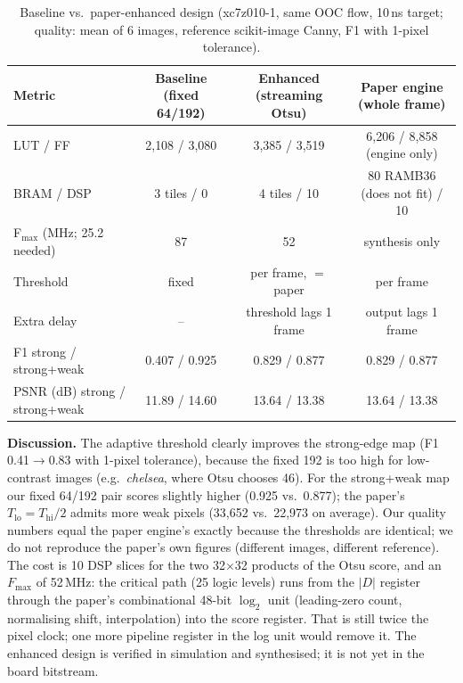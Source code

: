 \documentclass[11pt,a4paper]{article}
\begin{document}
\begin{table}[H]\centering\footnotesize
\caption{Baseline vs.\ paper-enhanced design (xc7z010-1, same OOC flow, 10\,ns target; quality: mean of 6 images, reference scikit-image Canny, F1 with 1-pixel tolerance).}\label{tab:paper}
\setlength{\tabcolsep}{4pt}
\begin{tabularx}{\linewidth}{@{}Xccc@{}}
\toprule
Metric & Baseline (fixed 64/192) & Enhanced (streaming Otsu) & Paper engine (whole frame)\\
\midrule
LUT / FF & 2{,}108 / 3{,}080 & 3{,}385 / 3{,}519 & 6{,}206 / 8{,}858 (engine only)\\
BRAM / DSP & 3 tiles / 0 & 4 tiles / 10 & 80 RAMB36 (does not fit) / 10\\
F$_\text{max}$ (MHz; 25.2 needed) & 87 & 52 & synthesis only\\
Threshold & fixed & per frame, $=$ paper & per frame\\
Extra delay & -- & threshold lags 1 frame & output lags 1 frame\\
F1 strong / strong+weak & 0.407 / 0.925 & 0.829 / 0.877 & 0.829 / 0.877\\
PSNR (dB) strong / strong+weak & 11.89 / 14.60 & 13.64 / 13.38 & 13.64 / 13.38\\
\bottomrule
\end{tabularx}
\end{table}
\textbf{Discussion.} The adaptive threshold clearly improves the strong-edge map (F1 0.41$\rightarrow$0.83 with 1-pixel tolerance),
because the fixed 192 is too high for low-contrast images (e.g.\ \emph{chelsea}, where Otsu chooses 46). For the strong+weak map our
fixed 64/192 pair scores slightly higher (0.925 vs.\ 0.877); the paper's $T_\text{lo}=T_\text{hi}/2$ admits more weak pixels (33{,}652
vs.\ 22{,}973 on average). Our quality numbers equal the paper engine's exactly because the thresholds are identical; we do not reproduce
the paper's own figures (different images, different reference). The cost is 10 DSP slices for the two 32$\times$32 products of the
Otsu score, and an $F_\text{max}$ of 52\,MHz: the critical path (25 logic levels) runs from the $|D|$ register through the paper's
combinational 48-bit $\log_2$ unit (leading-zero count, normalising shift, interpolation) into the score register. That is still twice
the pixel clock; one more pipeline register in the log unit would remove it. The
enhanced design is verified in simulation and synthesised; it is not yet in the board bitstream.

\end{document}

